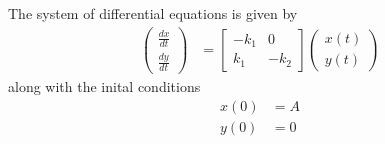 \documentclass{unswmaths}
\begin{document}
The system of differential equations is given by
\begin{align*}
    \left( \begin{array}{c} \frac{dx}{dt} \\ \frac{dy}{dt} \end{array}\right) &= \left[ \begin{array}{cc} -k_1 & 0 \\ k_1 & -k_2 \end{array} \right] \left( \begin{array}{c} x(t) \\ y(t) \end{array}\right)
\end{align*}
along with the inital conditions
\begin{align*}
    x(0) &= A \\
    y(0) &= 0 
\end{align*}
\end{document}
